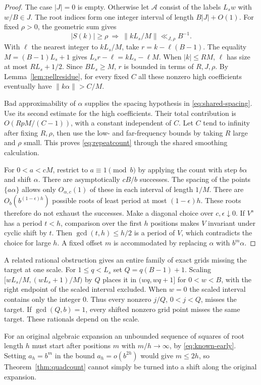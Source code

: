\begin{proof}
The case $|J|=0$ is empty. Otherwise let $\mathcal A$ consist of the labels $L_sw$ with $w/B\in J$. The root indices form one integer interval of length $B|J|+O(1)$. For fixed $\rho>0$, the geometric sum gives
\[
           |S(k)|\ge\rho\ \Longrightarrow\
             \|kL_s/M\|\ll_{J,\rho}B^{-1}.
\]
With $\ell$ the nearest integer to $kL_s/M$, take $r=k-\ell(B-1)$. The equality $M=(B-1)L_s+1$ gives $L_s r-\ell=kL_s-\ell M$. When $|k|\le RM$, $\ell$ has size at most $RL_s+1/2$. Since $BL_s\ge M$, $r$ is bounded in terms of $R,J,\rho$. By Lemma~\ref{lem:pellresidue}, for every fixed $C$ all these nonzero high coefficients eventually have $\|k\alpha\|>C/M$.

Bad approximability of $\alpha$ supplies the spacing hypothesis in \eqref{eq:shared-spacing}. Use its second estimate for the high coefficients. Their total contribution is $O(RpM/(C-1))$, with a constant independent of $C$. Let $C$ tend to infinity after fixing $R,\rho$, then use the low- and far-frequency bounds by taking $R$ large and $\rho$ small. This proves \eqref{eq:repeatcount} through the shared smoothing calculation.

For $0<a<cM$, restrict to $a\equiv1\pmod b$ by applying the count with step $b\alpha$ and shift $\alpha$. There are asymptotically $cB/b$ successes. The spacing of the points $\{a\alpha\}$ allows only $O_{\alpha,c}(1)$ of these in each interval of length $1/M$. There are $O_b(b^{(1-\epsilon)h})$ possible roots of least period at most $(1-\epsilon)h$. These roots therefore do not exhaust the successes. Make a diagonal choice over $c,\epsilon\downarrow0$. If $V^s$ has a period $t<h$, comparison over the first $h$ positions makes $V$ invariant under cyclic shift by $t$. Then $\gcd(t,h)\le h/2$ is a period of $V$, which contradicts the choice for large $h$. A fixed offset $m$ is accommodated by replacing $\alpha$ with $b^m\alpha$.
\end{proof}

A related rational obstruction gives an entire family of exact grids missing the target at one scale. For $1\le q<L_s$ set $Q=q(B-1)+1$. Scaling $[w L_s/M,(wL_s+1)/M)$ by $Q$ places it in $(wq,wq+1]$ for $0<w<B$, with the right endpoint of the scaled interval excluded. When $w=0$ the scaled interval contains only the integer $0$. Thus every nonzero $j/Q$, $0<j<Q$, misses the target. If $\gcd(Q,b)=1$, every shifted nonzero grid point misses the same target. These rationals depend on the scale.

For an original algebraic expansion an unbounded sequence of squares of root length $h$ must start after positions $m$ with $m/h\to\infty$, by \eqref{eq:known-early}. Setting $a_h=b^m$ in the bound $a_h=o(b^{2h})$ would give $m\le2h$, so Theorem~\ref{thm:quadcount} cannot simply be turned into a shift along the original expansion.
